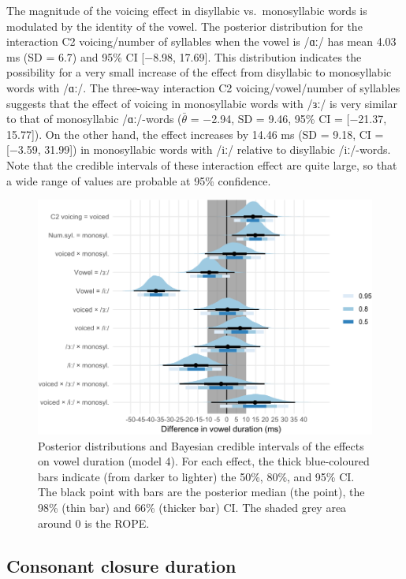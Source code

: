 \documentclass[
  12pt,
  a4paper,
  authoryear, 5p]{elsarticle}
\begin{document}
The magnitude of the voicing effect in disyllabic vs.~monosyllabic words
is modulated by the identity of the vowel. The posterior distribution
for the interaction C2 voicing/number of syllables when the vowel is
/ɑː/ has mean 4.03 ms (SD = 6.7) and 95\% CI {[}−8.98, 17.69{]}. This
distribution indicates the possibility for a very small increase of the
effect from disyllabic to monosyllabic words with /ɑː/. The three-way
interaction C2 voicing/vowel/number of syllables suggests that the
effect of voicing in monosyllabic words with /ɜː/ is very similar to
that of monosyllabic /ɑː/-words (\(\bar{\theta}\) = −2.94, SD = 9.46,
95\% CI = {[}−21.37, 15.77{]}). On the other hand, the effect increases
by 14.46 ms (SD = 9.18, CI = {[}−3.59, 31.99{]}) in monosyllabic words
with /iː/ relative to disyllabic /iː/-words. Note that the credible
intervals of these interaction effect are quite large, so that a wide
range of values are probable at 95\% confidence.

\begin{figure}
\includegraphics[width=\linewidth]{2019-english-rr_files/figure-latex/vow-4-intervals-1} \caption{Posterior distributions and Bayesian credible intervals of the effects on vowel duration (model 4). For each effect, the thick blue-coloured bars indicate (from darker to lighter) the 50\%, 80\%, and 95\% CI. The black point with bars are the posterior median (the point), the 98\% (thin bar) and 66\% (thicker bar) CI. The shaded grey area around 0 is the ROPE.}\label{f:vow-4-intervals}
\end{figure}

\hypertarget{consonant-closure-duration}{%
\subsection{Consonant closure
duration}\label{consonant-closure-duration}}
\end{document}
